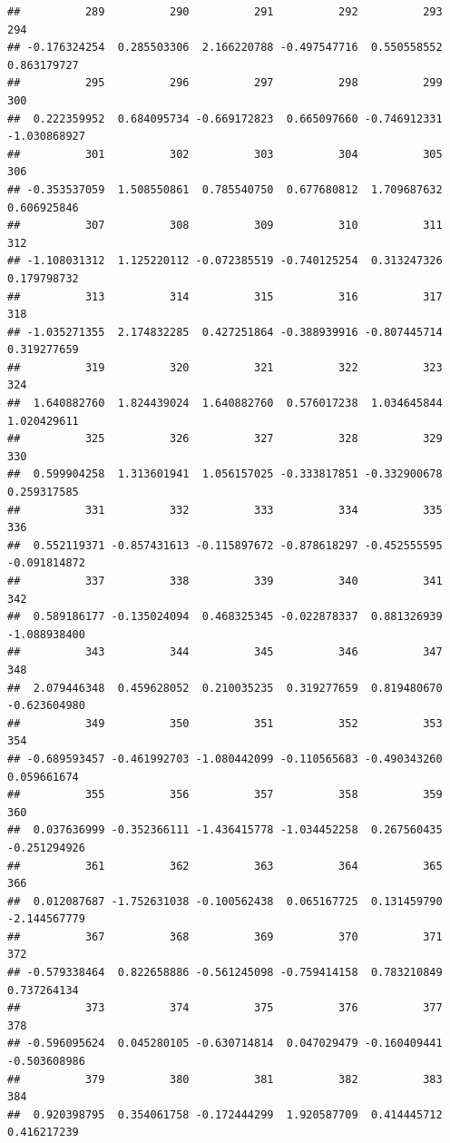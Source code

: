 \documentclass[
]{article}
\begin{document}
\begin{verbatim}
##          289          290          291          292          293          294 
## -0.176324254  0.285503306  2.166220788 -0.497547716  0.550558552  0.863179727 
##          295          296          297          298          299          300 
##  0.222359952  0.684095734 -0.669172823  0.665097660 -0.746912331 -1.030868927 
##          301          302          303          304          305          306 
## -0.353537059  1.508550861  0.785540750  0.677680812  1.709687632  0.606925846 
##          307          308          309          310          311          312 
## -1.108031312  1.125220112 -0.072385519 -0.740125254  0.313247326  0.179798732 
##          313          314          315          316          317          318 
## -1.035271355  2.174832285  0.427251864 -0.388939916 -0.807445714  0.319277659 
##          319          320          321          322          323          324 
##  1.640882760  1.824439024  1.640882760  0.576017238  1.034645844  1.020429611 
##          325          326          327          328          329          330 
##  0.599904258  1.313601941  1.056157025 -0.333817851 -0.332900678  0.259317585 
##          331          332          333          334          335          336 
##  0.552119371 -0.857431613 -0.115897672 -0.878618297 -0.452555595 -0.091814872 
##          337          338          339          340          341          342 
##  0.589186177 -0.135024094  0.468325345 -0.022878337  0.881326939 -1.088938400 
##          343          344          345          346          347          348 
##  2.079446348  0.459628052  0.210035235  0.319277659  0.819480670 -0.623604980 
##          349          350          351          352          353          354 
## -0.689593457 -0.461992703 -1.080442099 -0.110565683 -0.490343260  0.059661674 
##          355          356          357          358          359          360 
##  0.037636999 -0.352366111 -1.436415778 -1.034452258  0.267560435 -0.251294926 
##          361          362          363          364          365          366 
##  0.012087687 -1.752631038 -0.100562438  0.065167725  0.131459790 -2.144567779 
##          367          368          369          370          371          372 
## -0.579338464  0.822658886 -0.561245098 -0.759414158  0.783210849  0.737264134 
##          373          374          375          376          377          378 
## -0.596095624  0.045280105 -0.630714814  0.047029479 -0.160409441 -0.503608986 
##          379          380          381          382          383          384 
##  0.920398795  0.354061758 -0.172444299  1.920587709  0.414445712  0.416217239 

\end{verbatim}
\end{document}
